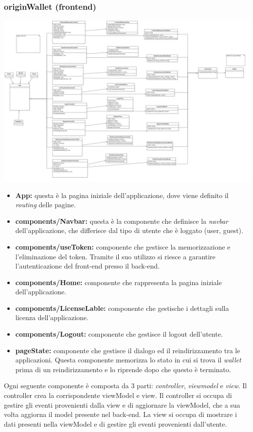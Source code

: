 \subsubsection{originWallet (frontend)}
\includegraphics[scale=0.2]{./res/img/frontendwallet.png}
\begin{itemize}
    \item \textbf{App:} questa è la pagina iniziale dell'applicazione, dove viene definito il \textit{routing} delle pagine.
    \item \textbf{components/Navbar:} questa è la componente che definisce la \textit{navbar} dell'applicazione, che differisce dal tipo di utente che è loggato (user, guest).
    \item \textbf{components/useToken:} componente che gestisce la memorizzazione e l'eliminazione del token. Tramite il suo utilizzo si riesce a garantire l'autenticazione del front-end presso il back-end.
    \item \textbf{components/Home:} componente che rappresenta la pagina iniziale dell'applicazione.
    \item \textbf{components/LicenseLable:} componente che gestische i dettagli sulla licenza dell'applicazione.
    \item \textbf{components/Logout:} componente che gestisce il logout dell'utente.  
    \item \textbf{pageState:} componente che gestisce il dialogo ed il reindirizzamento tra le applicazioni. Questa componente memorizza lo stato in cui si trova il \textit{wallet} prima di un reindirizzamento e lo riprende dopo che questo è terminato.
\end{itemize}

Ogni seguente componente è composta da 3 parti: \textit{controller}, \textit{viewmodel} e \textit{view}. Il controller crea la corrispondente
viewModel e view. Il controller si occupa di gestire gli eventi provenienti dalla view e di aggiornare la viewModel, che a sua volta aggiorna 
il model presente nel back-end. La view si occupa di mostrare i dati presenti nella viewModel e di gestire gli eventi provenienti dall'utente.


